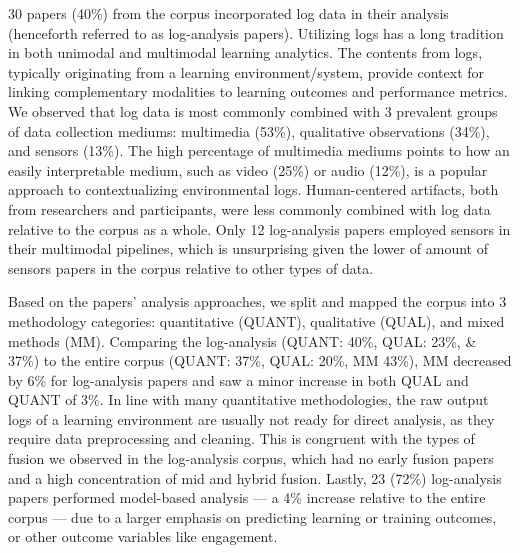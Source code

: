 \documentclass[manuscript,screen,review]{acmart}
\begin{document}
30 papers (40\%) from the corpus incorporated log data in their analysis (henceforth referred to as log-analysis papers). Utilizing logs has a long tradition in both unimodal and multimodal learning analytics. The contents from logs, typically originating from a learning environment/system, provide context for linking complementary modalities to learning outcomes and performance metrics. We observed that log data is most commonly combined with 3 prevalent groups of data collection mediums: multimedia (53\%), qualitative observations (34\%), and sensors (13\%). The high percentage of multimedia mediums points to how an easily interpretable medium, such as video (25\%) or audio (12\%), is a popular approach to contextualizing environmental logs. Human-centered artifacts, both from researchers and participants, were less commonly combined with log data relative to the corpus as a whole. Only 12 log-analysis papers employed sensors in their multimodal pipelines, which is unsurprising given the lower of amount of sensors papers in the corpus relative to other types of data. 

Based on the papers' analysis approaches, we split and mapped the corpus into 3 methodology categories: quantitative (QUANT), qualitative (QUAL), and mixed methods (MM). Comparing the log-analysis (QUANT: 40\%, QUAL: 23\%, \& 37\%) to the entire corpus (QUANT: 37\%, QUAL: 20\%, MM 43\%), MM decreased by 6\% for log-analysis papers and saw a minor increase in both QUAL and QUANT of 3\%. In line with many quantitative methodologies, the raw output logs of a learning environment are usually not ready for direct analysis, as they require data preprocessing and cleaning. This is congruent with the types of fusion we observed in the log-analysis corpus, which had no early fusion papers and a high concentration of mid and hybrid fusion. Lastly, 23 (72\%) log-analysis papers performed model-based analysis --- a 4\% increase relative to the entire corpus --- due to a larger emphasis on predicting learning or training outcomes, or other outcome variables like engagement.
\end{document}
